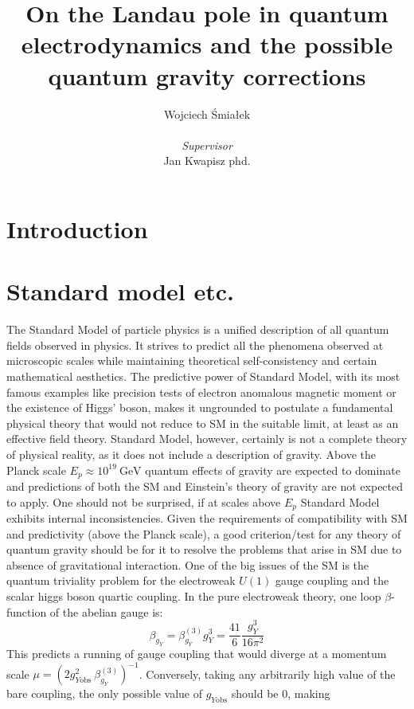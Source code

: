 \documentclass[11pt, a4paper]{article}
\title{\vspace{-2cm}On the Landau pole in quantum electrodynamics and the possible quantum gravity corrections}
\author{{Wojciech Śmiałek}\\
\\
{\textit{Supervisor}} \\
{Jan Kwapisz phd.}}
\date{}
\begin{document}
\maketitle

\section*{Introduction}

\section{Standard model etc.}
The Standard Model of particle physics is a unified description of all quantum fields observed in physics. 
It strives to predict all the phenomena observed at microscopic scales while maintaining theoretical
self-consistency and certain mathematical aesthetics. The predictive power of Standard Model, with its most
famous examples like precision tests of electron anomalous magnetic moment or the existence of Higgs' boson,
makes it ungrounded to postulate a fundamental physical theory that would not reduce to SM in the suitable limit, at least
as an effective field theory.
Standard Model, however, certainly is not a complete theory of physical reality, as it does not include a description
of gravity. Above the Planck scale $E_p \approx 10^{19} \ \text{GeV}$ quantum effects of gravity are expected to dominate
and predictions of both the SM and Einstein's theory of gravity are not expected to apply.
One should not be surprised, if at scales above $E_p$ Standard Model exhibits internal inconsistencies.
Given the requirements of compatibility with SM and predictivity (above the Planck scale), a good criterion/test
for any theory of quantum gravity should be for it to resolve the problems that arise in SM due to absence of
gravitational interaction. 
One of the big issues of the SM is the quantum triviality problem for the electroweak $U(1)$ gauge coupling and
the scalar higgs boson quartic coupling.
In the pure electroweak theory, one loop $\beta$-function of the abelian gauge \cite{betaf scalar} \cite{betaf chiral lagrangian} is:%
\begin{equation}
    \beta_{g_Y} = \beta_{g_Y}^{(3)} g_Y^3 = \frac{41}{6} \frac{g_Y^3}{16 \pi^2}
\end{equation}
This predicts a running of gauge coupling that would diverge at a momentum scale $\mu = \left(2 g_{Y\text{obs}}^2 \ \beta_{g_Y}^{(3)} \right)^{-1} $.
Conversely, taking any arbitrarily high value of the bare coupling, the only possible value of $g_{Y\text{obs}}$ should be 0, making
\end{document}
